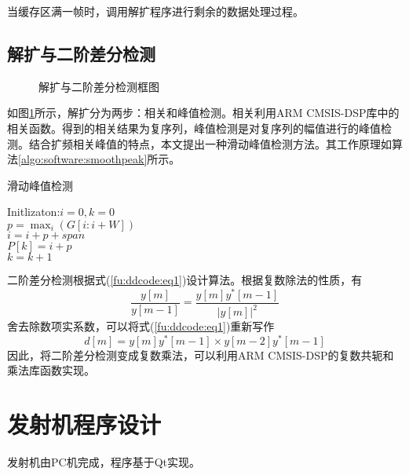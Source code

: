 当缓存区满一帧时，调用解扩程序进行剩余的数据处理过程。

\subsection{解扩与二阶差分检测}
\begin{figure}[htbp]
	\centering
	
	\caption{解扩与二阶差分检测框图}
	\label{fig:software:despread}
\end{figure}
如图\ref{fig:software:despread}所示，解扩分为两步：相关和峰值检测。相关利用ARM CMSIS-DSP库中的相关函数。得到的相关结果为复序列，峰值检测是对复序列的幅值进行的峰值检测。结合扩频相关峰值的特点，本文提出一种滑动峰值检测方法。其工作原理如算法\ref{algo:software:smoothpeak}所示。
\begin{center}
	\begin{minipage}{0.8\textwidth}
		\centering
		\begin{algorithm}[H]
			\caption{滑动峰值检测}
			\label{algo:software:smoothpeak}
			Initlizaton:$i=0,k=0$\\
			 {
				$p=\max_i(G[i:i+W])$\\
				$i=i+p+span$\\
				$P[k]=i+p$\\
				$k=k+1$
			}
		\end{algorithm}
	\end{minipage}
\end{center}

二阶差分检测根据式(\ref{fu:ddcode:eq1})设计算法。根据复数除法的性质，有
\[
\frac{y[m]}{y[m-1]}=\frac{y[m]y^*[m-1]}{|y[m]|^2}
\]
舍去除数项实系数，可以将式(\ref{fu:ddcode:eq1})重新写作
\begin{equation}
d[m]=y[m]y^*[m-1]\times y[m-2]y^*[m-1]
\end{equation}
因此，将二阶差分检测变成复数乘法，可以利用ARM CMSIS-DSP的复数共轭和乘法库函数实现。

\section{发射机程序设计}
发射机由PC机完成，程序基于Qt实现。


	
	
	
	